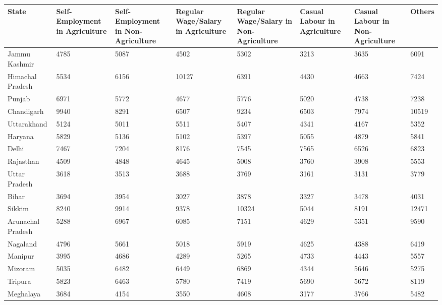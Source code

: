 \documentclass{article}
\begin{document}
	
	\begin{longtable}{|p{2cm}|p{1.9cm}|p{1.95cm}|p{2cm}|p{1.85cm}|p{2cm}|p{2cm}|p{1cm}|}
		\hline
		\textbf{State} & \textbf{Self-Employment in Agriculture} & \textbf{Self-Employment in Non-Agriculture} & \textbf{Regular Wage/Salary in Agriculture} & \textbf{Regular Wage/Salary in Non-Agriculture} & \textbf{Casual Labour in Agriculture} & \textbf{Casual Labour in Non-Agriculture} & \textbf{Others} \\ \hline
		\endhead
		
		Jammu  Kashmir    & 4785  & 5087  & 4502  & 5302  & 3213  & 3635  & 6091  \\ \hline
		Himachal Pradesh   & 5534  & 6156  & 10127 & 6391  & 4430  & 4663  & 7424  \\ \hline
		Punjab             & 6971  & 5772  & 4677  & 5776  & 5020  & 4738  & 7238  \\ \hline
		Chandigarh         & 9940  & 8291  & 6507  & 9234  & 6503  & 7974  & 10519 \\ \hline
		Uttarakhand        & 5124  & 5011  & 5511  & 5407  & 4341  & 4167  & 5352  \\ \hline
		Haryana            & 5829  & 5136  & 5102  & 5397  & 5055  & 4879  & 5841  \\ \hline
		Delhi              & 7467  & 7204  & 8176  & 7545  & 7565  & 6526  & 6823  \\ \hline
		Rajasthan          & 4509  & 4848  & 4645  & 5008  & 3760  & 3908  & 5553  \\ \hline
		Uttar Pradesh      & 3618  & 3513  & 3688  & 3769  & 3161  & 3131  & 3779  \\ \hline
		Bihar              & 3694  & 3954  & 3027  & 3878  & 3327  & 3478  & 4031  \\ \hline
		Sikkim             & 8240  & 9914  & 9378  & 10324 & 5044  & 8191  & 12471 \\ \hline
		Arunachal Pradesh  & 5288  & 6967  & 6085  & 7151  & 4629  & 5351  & 9590  \\ \hline
		Nagaland           & 4796  & 5661  & 5018  & 5919  & 4625  & 4388  & 6419  \\ \hline
		Manipur            & 3995  & 4686  & 4289  & 5265  & 4733  & 4443  & 5557  \\ \hline
		Mizoram            & 5035  & 6482  & 6449  & 6869  & 4344  & 5646  & 5275  \\ \hline
		Tripura            & 5823  & 6463  & 5780  & 7419  & 5690  & 5672  & 8119  \\ \hline
		Meghalaya          & 3684  & 4154  & 3550  & 4608  & 3177  & 3766  & 5482  \\ \hline

\end{longtable}
\end{document}
